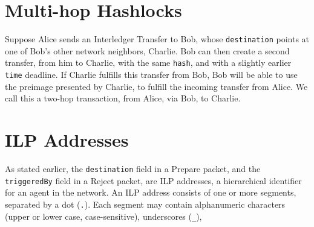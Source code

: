 \documentclass[11pt,twoside,a4paper]{article}
\begin{document}
\section{Multi-hop Hashlocks}
Suppose Alice sends an Interledger Transfer to Bob, whose {\tt destination} points at one of Bob's other network neighbors, Charlie. Bob can then create a second
transfer, from him to Charlie, with the same {\tt hash}, and with a slightly earlier {\tt time} deadline. If Charlie fulfills this transfer from Bob, Bob will be able
to use the preimage presented by Charlie, to fulfill the incoming transfer from Alice. We call this a two-hop transaction, from Alice, via Bob, to Charlie.

\section{ILP Addresses}
As stated earlier, the {\tt destination} field in a Prepare packet, and the {\tt triggeredBy} field in a Reject packet, are ILP addresses, a hierarchical identifier for an agent in the network.
An ILP address consists of one or more segments, separated by a dot ({\tt .}). Each segment may contain alphanumeric characters (upper or lower case, case-sensitive),
underscores ({\tt _}),
\end{document}
